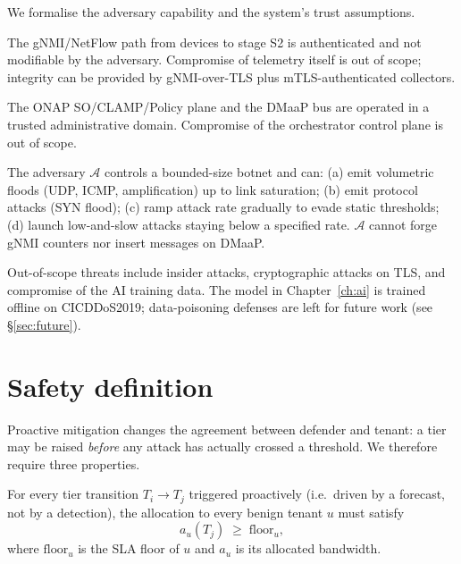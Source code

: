 We formalise the adversary capability and the system's trust assumptions.

\begin{assumption}
\label{asm:telemetry}
The gNMI/NetFlow path from devices to stage S2 is authenticated and not
modifiable by the adversary. Compromise of telemetry itself is out of
scope; integrity can be provided by gNMI-over-TLS plus mTLS-authenticated
collectors.
\end{assumption}

\begin{assumption}
\label{asm:control}
The ONAP SO/CLAMP/Policy plane and the DMaaP bus are operated in a trusted
administrative domain. Compromise of the orchestrator control plane is
out of scope.
\end{assumption}

\begin{definition}
\label{def:adv}
The adversary $\mathcal{A}$ controls a bounded-size botnet and can:
(a) emit volumetric floods (UDP, ICMP, amplification) up to link
saturation; (b) emit protocol attacks (SYN flood); (c) ramp attack rate
gradually to evade static thresholds; (d) launch low-and-slow attacks
staying below a specified rate. $\mathcal{A}$ cannot forge gNMI counters
nor insert messages on DMaaP.
\end{definition}

Out-of-scope threats include insider attacks, cryptographic attacks on
TLS, and compromise of the AI training data. The model in
Chapter~\ref{ch:ai} is trained offline on CICDDoS2019; data-poisoning
defenses are left for future work (see §\ref{sec:future}).

\section{Safety definition}
\label{sec:safety}

Proactive mitigation changes the agreement between defender and tenant:
a tier may be raised \emph{before} any attack has actually crossed a
threshold. We therefore require three properties.

\begin{definition}
\label{def:safety}
For every tier transition $T_i \to T_j$ triggered proactively (i.e.~driven
by a forecast, not by a detection), the allocation to every benign tenant
$u$ must satisfy
\[
  a_u(T_j) \;\geq\; \text{floor}_u,
\]
where $\text{floor}_u$ is the SLA floor of $u$ and $a_u$ is its allocated
bandwidth.
\end{definition}

